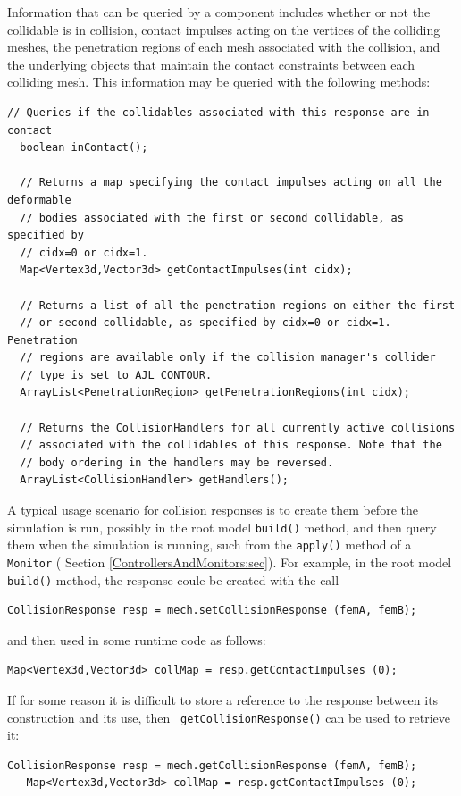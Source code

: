 Information that can be queried by a
 component
includes whether or not the collidable is in collision, contact
impulses acting on the vertices of the colliding meshes, the
penetration regions of each mesh associated with the collision, and
the underlying 
objects that maintain the contact constraints between each colliding
mesh. This information may be queried with the following methods:
%
\begin{lstlisting}[]
  // Queries if the collidables associated with this response are in contact
  boolean inContact(); 

  // Returns a map specifying the contact impulses acting on all the deformable 
  // bodies associated with the first or second collidable, as specified by
  // cidx=0 or cidx=1.
  Map<Vertex3d,Vector3d> getContactImpulses(int cidx);

  // Returns a list of all the penetration regions on either the first
  // or second collidable, as specified by cidx=0 or cidx=1. Penetration
  // regions are available only if the collision manager's collider
  // type is set to AJL_CONTOUR.
  ArrayList<PenetrationRegion> getPenetrationRegions(int cidx);

  // Returns the CollisionHandlers for all currently active collisions
  // associated with the collidables of this response. Note that the
  // body ordering in the handlers may be reversed.
  ArrayList<CollisionHandler> getHandlers();
\end{lstlisting}
%

A typical usage scenario for collision responses is to create them
before the simulation is run, possibly in the root model {\tt build()}
method, and then query them when the simulation is running, such from
the {\tt apply()} method of a {\tt Monitor} (
Section \ref{ControllersAndMonitors:sec}). For example,
in the root model {\tt build()} method, the response
coule be created with the call
%
\begin{lstlisting}[]
   CollisionResponse resp = mech.setCollisionResponse (femA, femB);
\end{lstlisting}
%
and then used in some runtime code as follows:
%
\begin{lstlisting}[]
   Map<Vertex3d,Vector3d> collMap = resp.getContactImpulses (0);
\end{lstlisting}
%
If for some reason it is difficult to store a reference to the
response between its construction and its use, then {\tt
getCollisionResponse()} can be used to retrieve it:
%
\begin{lstlisting}[]
   CollisionResponse resp = mech.getCollisionResponse (femA, femB);
   Map<Vertex3d,Vector3d> collMap = resp.getContactImpulses (0);
\end{lstlisting}
%

